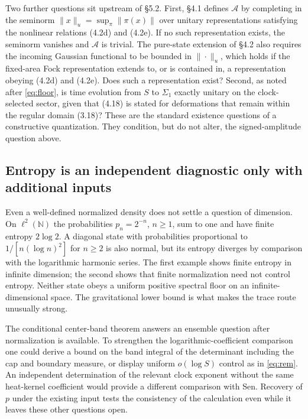 \documentclass[11pt]{article}
\begin{document}
Two further questions sit upstream of \S5.2. First, \S4.1 defines $\mathcal A$ by completing in the seminorm $\|x\|_u=\sup_\pi\|\pi(x)\|$ over unitary representations satisfying the nonlinear relations (4.2d) and (4.2e). If no such representation exists, the seminorm vanishes and $\mathcal A$ is trivial. The pure-state extension of \S4.2 also requires the incoming Gaussian functional to be bounded in $\|\cdot\|_u$, which holds if the fixed-area Fock representation extends to, or is contained in, a representation obeying (4.2d) and (4.2e). Does such a representation exist? Second, as noted after \eqref{eq:floor}, is time evolution from $S$ to $\Sigma_1$ exactly unitary on the clock-selected sector, given that (4.18) is stated for deformations that remain within the regular domain (3.18)? These are the standard existence questions of a constructive quantization. They condition, but do not alter, the signed-amplitude question above.

\subsection{Entropy is an independent diagnostic only with additional inputs}
Even a well-defined normalized density does not settle a question of dimension. On $\ell^2(\mathbb N)$ the probabilities $p_n=2^{-n}$, $n\ge1$, sum to one and have finite entropy $2\log2$. A diagonal state with probabilities proportional to $1/[n(\log n)^2]$ for $n\ge2$ is also normal, but its entropy diverges by comparison with the logarithmic harmonic series. The first example shows finite entropy in infinite dimension; the second shows that finite normalization need not control entropy. Neither state obeys a uniform positive spectral floor on an infinite-dimensional space. The gravitational lower bound is what makes the trace route unusually strong.

The conditional center-band theorem answers an ensemble question after normalization is available. To strengthen the logarithmic-coefficient comparison one could derive a bound on the band integral of the determinant including the cap and boundary measure, or display uniform $o(\log S)$ control as in \eqref{eq:rem}. An independent determination of the relevant clock exponent without the same heat-kernel coefficient would provide a different comparison with Sen. Recovery of $p$ under the existing input tests the consistency of the calculation even while it leaves these other questions open.
\end{document}
